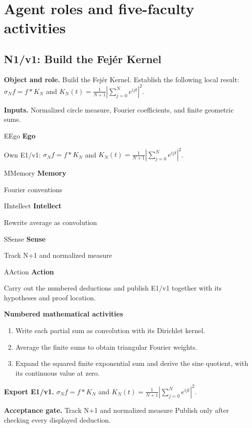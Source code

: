 \documentclass[preprint,12pt,aps,pra,showkeys,amsmath,amssymb,superscriptaddress,floatfix]{revtex4-2}
\theoremstyle{definition}
\theoremstyle{remark}
\newcommand{\mmfaculty}[3]{%
 \begin{mmfacultybox}{#1}{#2}
 {\sffamily\bfseries\color{MMBlue}#2}\par\smallskip #3
 \end{mmfacultybox}}
\newcommand{\field}[2]{\par\smallskip\noindent\textbf{#1.} #2\par}
\begin{document}
\endgroup

\clearpage\section{Agent roles and five-faculty activities}\begingroup\small\linespread{1.05}\selectfont{}

\subsection{N1/v1: Build the Fejér Kernel}

\field{Object and role}{Build the Fejér Kernel. Establish the following local result:
\(\sigma_N f=f*K_N\) and \(K_N(t)=\frac1{N+1}|\sum_{j=0}^N e^{ijt}|^2\).}

\field{Inputs}{Normalized circle measure, Fourier coefficients, and finite geometric
sums.}

\mmfaculty{E}{Ego}{Own E1/v1: \(\sigma_N f=f*K_N\) and
\(K_N(t)=\frac1{N+1}|\sum_{j=0}^N e^{ijt}|^2\).}

\mmfaculty{M}{Memory}{Fourier conventions}

\mmfaculty{I}{Intellect}{Rewrite average as convolution}

\mmfaculty{S}{Sense}{Track N+1 and normalized measure}

\mmfaculty{A}{Action}{Carry out the numbered deductions and publish E1/v1 together with its
hypotheses and proof location.}

\smallskip\noindent\textbf{Numbered mathematical activities}

\begin{enumerate}[label=N1.\arabic*,leftmargin=3.4em]

\item Write each partial sum as convolution with its Dirichlet kernel.

\item Average the finite sums to obtain triangular Fourier weights.

\item Expand the squared finite exponential sum and derive the sine quotient,
with its continuous value at zero.

\end{enumerate}

\field{Export E1/v1}{\(\sigma_N f=f*K_N\) and \(K_N(t)=\frac1{N+1}|\sum_{j=0}^N e^{ijt}|^2\).}

\field{Acceptance gate}{Track N+1 and normalized measure Publish only after checking every
displayed deduction.}
\end{document}
